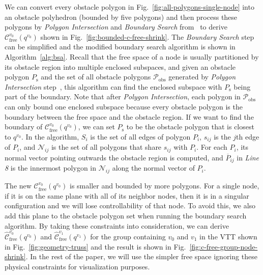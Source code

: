 \documentclass[journal]{IEEEtran}
\begin{document}
We can convert every obstacle polygon in
Fig.~\ref{fig:all-polygons-single-node} into an obstacle polyhedron
(bounded by five polygons) and then process these polygons by
\textit{Polygon Intersection} and \textit{Boundary Search}
from~\cite{Liu-vtt-cspace-icra-2020} to derive
$\mathcal{C}_{\mathrm{free}}^{v_0}(q^{v_0})$ shown in
Fig.~\ref{fig:bounded-c-free-shrink}. The \textit{Boundary Search}
step can be simplified and the modified boundary search algorithm is
shown in Algorithm~\ref{alg:bsa}. Recall that the free space of a node
is usually partitioned by its obstacle region into multiple enclosed
subspaces, and given an obstacle polygon $P_{\mathrm{s}}$ and the set
of all obstacle polygons $\mathcal{P}_{\mathrm{obs}}$ generated by
\textit{Polygon Intersection} step~\cite{Liu-vtt-cspace-icra-2020},
this algorithm can find the enclosed subspace with $P_{\mathrm{s}}$
being part of the boundary. Note that after \textit{Polygon
  Intersection}, each polygon in $\mathcal{P}_{\mathrm{obs}}$ can only
bound one enclosed subspace because every obstacle polygon is the
boundary between the free space and the obstacle region. If we want to
find the boundary of $\mathcal{C}_{\mathrm{free}}^{v_0}(q^{v_0})$, we
can set $P_{\mathrm{s}}$ to be the obstacle polygon that is closest to
$q^{v_0}$. In the algorithm, $S_i$ is the set of all edges of polygon
$P_i$, $s_{ij}$ is the $j$th edge of $P_i$, and $\mathcal{N}_{ij}$ is
the set of all polygons that share $s_{ij}$ with $P_i$. For each
$P_i$, its normal vector pointing outwards the obstacle region is
computed, and $\overline{P}_{ij}$ in \textit{Line 8} is the innermost
polygon in $\mathcal{N}_{ij}$ along the normal vector of $P_i$.

The new $\mathcal{C}_{\mathrm{free}}^{v_0}(q^{v_0})$ is smaller and
bounded by more polygons. For a single node, if it is on the same
plane with all of its neighbor nodes, then it is in a singular
configuration and we will lose controllability of that node. To avoid
this, we also add this plane to the obstacle polygon set when running
the boundary search algorithm. By taking these constraints into
consideration, we can derive
$\widehat{\mathcal{C}}_{\mathrm{free}}^{v_0}(q^{v_0})$ and
$\widehat{\mathcal{C}}_{\mathrm{free}}^{v_1}(q^{v_1})$ for the group
containing $v_0$ and $v_1$ in the VTT shown in
Fig.~\ref{fig:geometry-truss} and the result is shown in
Fig.~\ref{fig:c-free-group-node-shrink}. In the rest of the paper, we
will use the simpler free space ignoring these physical constraints
for visualization purposes.
\end{document}
